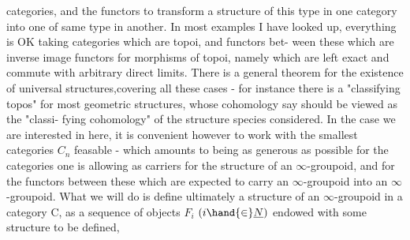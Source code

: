 categories,  and the functors to transform a structure of this type in one
category into one of same type in another.  In most examples I have looked
up,  everything is OK taking categories which are topoi, and functors bet-%
ween these which are inverse image functors for morphisms of topoi, namely
which are left exact and commute with arbitrary direct limits.  There is a
general theorem for the existence of universal structures,covering all
these cases  -  for instance there is a "classifying topos" for most 
geometric structures,  whose cohomology say should be viewed as the "classi-%
fying cohomology" of the structure species considered.  In the case we are
interested in here,  it is convenient however to work with the smallest
categories $C_n$ feasable  -  which amounts to being as generous as possible
for the categories   one is allowing  as carriers for the
structure of an $\infty$-groupoid,  and for the functors between these which are
expected to carry an $\infty$-groupoid into an $\infty$-groupoid.  What we will do is
define ultimately a structure of an $\infty$-groupoid in a category C,  as a
sequence of objects $F_i$ $(i\hand{\in} \underline{N})$ \hand{,} endowed with some structure to be defined,

